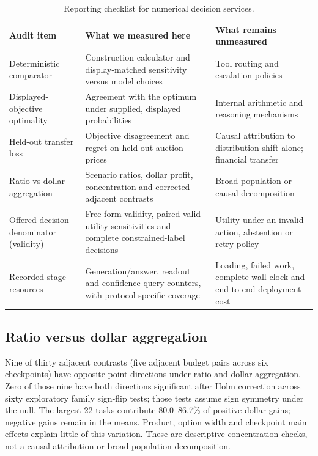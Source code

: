 \documentclass[sigconf,anonymous,nonacm]{acmart}
\begin{document}
\begin{table}[!b]
\caption{Reporting checklist for numerical decision services.}\label{tab:reportingchecklist}
\centering\small
\begin{tabularx}{\textwidth}{@{}p{}XX@{}}\toprule
Audit item & What we measured here & What remains unmeasured \\\midrule
Deterministic comparator & Construction calculator and display-matched sensitivity versus model choices & Tool routing and escalation policies \\
Displayed-objective optimality & Agreement with the optimum under supplied, displayed probabilities & Internal arithmetic and reasoning mechanisms \\
Held-out transfer loss & Objective disagreement and regret on held-out auction prices & Causal attribution to distribution shift alone; financial transfer \\
Ratio vs dollar aggregation & Scenario ratios, dollar profit, concentration and corrected adjacent contrasts & Broad-population or causal decomposition \\
Offered-decision denominator (validity) & Free-form validity, paired-valid utility sensitivities and complete constrained-label decisions & Utility under an invalid-action, abstention or retry policy \\
Recorded stage resources & Generation/answer, readout and confidence-query counters, with protocol-specific coverage & Loading, failed work, complete wall clock and end-to-end deployment cost \\
\bottomrule\end{tabularx}
\end{table}

\subsection{Ratio versus dollar aggregation}
Nine of thirty adjacent contrasts (five adjacent budget pairs across six checkpoints) have opposite point directions under ratio and dollar aggregation. Zero of those nine have both directions significant after Holm correction across sixty exploratory family sign-flip tests; those tests assume sign symmetry under the null. The largest 22 tasks contribute 80.0--86.7\% of positive dollar gains; negative gains remain in the means. Product, option width and checkpoint main effects explain little of this variation. These are descriptive concentration checks, not a causal attribution or broad-population decomposition.
\end{document}
